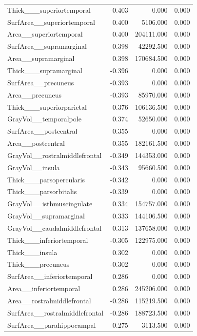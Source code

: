 \documentclass{article}
\begin{document}
\begin{longtable}{lrrr}
	Thick\_\_\_superiortemporal & -0.403 & 0.000 & 0.000 \\
	SurfArea\_\_superiortemporal & 0.400 & 5106.000 & 0.000 \\
	Area\_\_superiortemporal & 0.400 & 204111.000 & 0.000 \\
	SurfArea\_\_supramarginal & 0.398 & 42292.500 & 0.000 \\
	Area\_\_supramarginal & 0.398 & 170684.500 & 0.000 \\
	Thick\_\_\_supramarginal & -0.396 & 0.000 & 0.000 \\
	SurfArea\_\_precuneus & -0.393 & 0.000 & 0.000 \\
	Area\_\_precuneus & -0.393 & 85970.000 & 0.000 \\
	Thick\_\_\_superiorparietal & -0.376 & 106136.500 & 0.000 \\
	GrayVol\_\_temporalpole & 0.374 & 52650.000 & 0.000 \\
	SurfArea\_\_postcentral & 0.355 & 0.000 & 0.000 \\
	Area\_\_postcentral & 0.355 & 182161.500 & 0.000 \\
	GrayVol\_\_rostralmiddlefrontal & -0.349 & 144353.000 & 0.000 \\
	GrayVol\_\_insula & -0.343 & 95660.500 & 0.000 \\
	Thick\_\_\_parsopercularis & -0.342 & 0.000 & 0.000 \\
	Thick\_\_\_parsorbitalis & -0.339 & 0.000 & 0.000 \\
	GrayVol\_\_isthmuscingulate & 0.334 & 154757.000 & 0.000 \\
	GrayVol\_\_supramarginal & 0.333 & 144106.500 & 0.000 \\
	GrayVol\_\_caudalmiddlefrontal & 0.313 & 137658.000 & 0.000 \\
	Thick\_\_\_inferiortemporal & -0.305 & 122975.000 & 0.000 \\
	Thick\_\_\_insula & 0.302 & 0.000 & 0.000 \\
	Thick\_\_\_precuneus & -0.302 & 0.000 & 0.000 \\
	SurfArea\_\_inferiortemporal & 0.286 & 0.000 & 0.000 \\
	Area\_\_inferiortemporal & 0.286 & 245206.000 & 0.000 \\
	Area\_\_rostralmiddlefrontal & -0.286 & 115219.500 & 0.000 \\
	SurfArea\_\_rostralmiddlefrontal & -0.286 & 188723.500 & 0.000 \\
	SurfArea\_\_parahippocampal & 0.275 & 3113.500 & 0.000 \\

\end{longtable}
\end{document}
